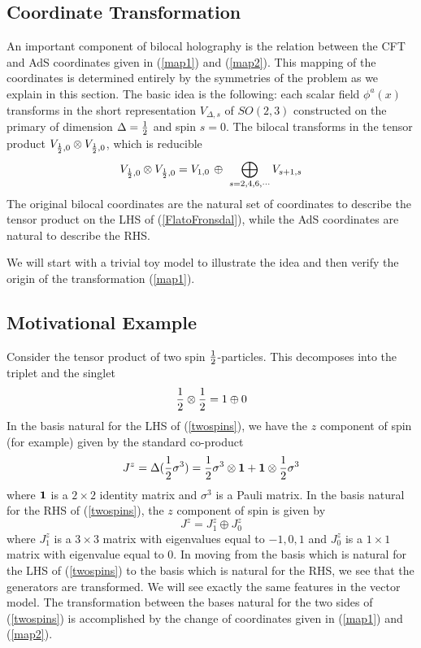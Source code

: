 \documentclass[a4paper,12pt]{article}
\begin{document}
\begin{appendix}

\section{Coordinate Transformation}\label{BMap}

An important component of bilocal holography is the relation between the CFT and AdS coordinates given in 
(\ref{map1}) and (\ref{map2}).
This mapping of the coordinates is determined entirely by the symmetries of the problem as we explain in this section.
The basic idea is the following: each scalar field $\phi^a(x)$ transforms in the short representation $V_{\Delta,s}$ 
of $SO(2,3)$ constructed on the primary of dimension $\Delta={1\over 2}$ and spin $s=0$.
The bilocal transforms in the tensor product $V_{{1\over 2},0}\otimes V_{{1\over 2},0}$, which is reducible
%
\begin{equation}
V_{{1\over 2},0}\otimes V_{{1\over 2},0} = V_{1,0}\,\oplus\,\,\bigoplus_{s=2,4,6,\cdots} V_{s+1,s}
\label{FlatoFronsdal}
\end{equation}
%
The original bilocal coordinates are the natural set of coordinates to describe the tensor product on the LHS of
(\ref{FlatoFronsdal}), while the AdS coordinates are natural to describe the RHS.

We will start with a trivial toy model to illustrate the idea and then verify the origin of the transformation (\ref{map1}).

\subsection{Motivational Example}

Consider the tensor product of two spin ${1\over 2}$-particles. 
This decomposes into the triplet and the singlet
%
\begin{equation}
{1\over 2}\otimes {1\over 2} = 1\oplus 0\label{twospins}
\end{equation}
%
In the basis natural for the LHS of (\ref{twospins}), we have the $z$ component of spin (for example) given by
the standard co-product
%
\begin{equation}
J^z= \Delta({1\over 2}\sigma^3)={1\over 2}\sigma^3\otimes {\bf 1}+{\bf 1}\otimes{1\over 2}\sigma^3
\end{equation}
%
where ${\bf 1}$ is a $2\times 2$ identity matrix and $\sigma^3$ is a Pauli matrix.
In the basis natural for the RHS of (\ref{twospins}), the $z$ component of spin is given by
%
\begin{equation}
J^z= J^z_1\oplus J^z_0
\end{equation}
%
where $J^z_1$ is a $3\times 3$ matrix with eigenvalues equal to $-1,0,1$ and $J^z_0$ is a $1\times 1$ matrix with
eigenvalue equal to 0.
In moving from the basis which is natural for the LHS of (\ref{twospins}) to the basis which is natural for the RHS, we see
that the generators are transformed.
We will see exactly the same features in the vector model.
The transformation between the bases natural for the two sides of (\ref{twospins}) is accomplished by the change of
coordinates given in (\ref{map1}) and (\ref{map2}).



\end{appendix}
\end{document}
